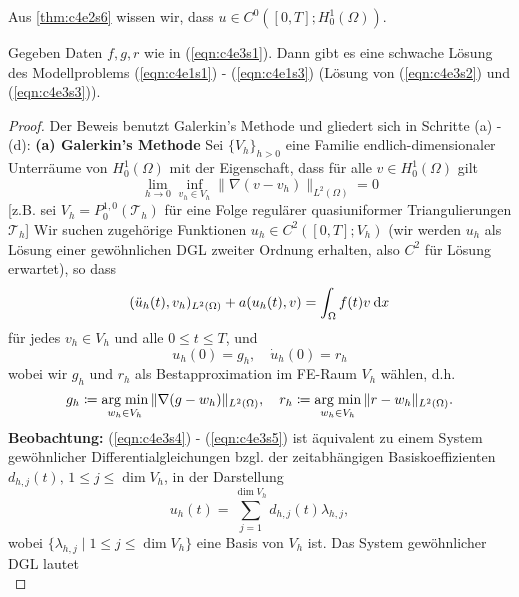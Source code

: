 \documentclass[../skript.tex]{subfiles}
\begin{document}
\begin{remark}\label{rem:c4e3s2}
	Aus \cref{thm:c4e2s6} wissen wir, dass $u\in C^0([0,T];H^1_0(\Omega))$.
\end{remark}

\begin{theorem}\label{thm:c4e3s3}
	Gegeben Daten $f,g,r$ wie in (\ref{eqn:c4e3s1}). Dann gibt es eine schwache Lösung des Modellproblems (\ref{eqn:c4e1s1}) - (\ref{eqn:c4e1s3}) (Lösung von (\ref{eqn:c4e3s2}) und (\ref{eqn:c4e3s3})).
\end{theorem}

\begin{proof}
	Der Beweis benutzt Galerkin's Methode und gliedert sich in Schritte (a) - (d):\newline\newline\noindent
	\textbf{(a) Galerkin's Methode  } Sei $\{V_h\}_{h>0}$ eine Familie endlich-dimensionaler Unterräume von $H^1_0(\Omega)$ mit der Eigenschaft, dass für alle $v\in H^1_0(\Omega)$ gilt
	\[
		\lim_{h\to 0}\inf_{v_h\in V_h} \|\nabla(v-v_h)\|_{L^2(\Omega)} = 0
	\]	
	[z.B. sei $V_h = P^{1,0}_0(\mathcal{T}_h)$ für eine Folge regulärer quasiuniformer Triangulierungen $\mathcal{T}_h$]\newline\noindent
	Wir suchen zugehörige Funktionen $u_h\in C^2([0,T];V_h)$ (wir werden $u_h$ als Lösung einer gewöhnlichen DGL zweiter Ordnung erhalten, also $C^2$ für Lösung erwartet), so dass 
	\begin{equation}\label{eqn:c4e3s4}
		(\ddot{u}_h (t), v_h)_{L^2(\Omega)} + a(u_h(t),v) = \int_\Omega f(t)v\:\mathrm{d}x
	\end{equation}
	für jedes $v_h\in V_h$ und alle $0\leq t\leq T$, und 
	\begin{equation}\label{eqn:c4e3s5}
		u_h(0) = g_h, \quad\dot{u}_h(0) = r_h
	\end{equation} 
	wobei wir $g_h$ und $r_h$ als Bestapproximation im FE-Raum $V_h$ wählen, d.h.
	\[
		g_h\coloneqq \operatorname*{arg\;min}_{w_h\in V_h} \|\nabla (g-w_h)\|_{L^2(\Omega)},\quad r_h\coloneqq\operatorname*{arg\;min}_{w_h\in V_h}\|r-w_h\|_{L^2(\Omega)}.
	\]
	\textbf{Beobachtung: } (\ref{eqn:c4e3s4}) - (\ref{eqn:c4e3s5}) ist äquivalent zu einem System gewöhnlicher Differentialgleichungen bzgl. der zeitabhängigen Basiskoeffizienten $d_{h,j}(t),\,1\leq j\leq\dim{V_h}$, in der Darstellung
	\[
		u_h(t) = \sum_{j=1}^{\dim{V_h}} d_{h,j}(t)\lambda_{h,j},
	\]
	wobei $\{\lambda_{h,j}\mid 1\leq j\leq\dim{V_h}\}$ eine Basis von $V_h$ ist. Das System gewöhnlicher DGL lautet
	\begin{equation}\label{eqn:c4e3s7}

\end{equation}
\end{proof}
\end{document}
